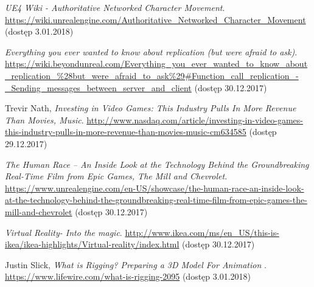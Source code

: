 \documentclass[multip]{SGGW-thesis}
\begin{document}
\begin{thebibliography}{9}
\textit{UE4 Wiki - Authoritative Networked Character Movement}. \url{https://wiki.unrealengine.com/Authoritative_Networked_Character_Movement}  (dostęp 3.01.2018)

\textit{Everything you ever wanted to know about replication (but were afraid to ask)}. \url{https://wiki.beyondunreal.com/Everything_you_ever_wanted_to_know_about_replication_\%28but_were_afraid_to_ask\%29#Function_call_replication_-_Sending_messages_between_server_and_client} (dostęp 30.12.2017)

Trevir Nath, \textit{Investing in Video Games: This Industry Pulls In More Revenue Than Movies, Music}.
\url{http://www.nasdaq.com/article/investing-in-video-games-this-industry-pulls-in-more-revenue-than-movies-music-cm634585} {\mbox(dostęp 29.12.2017)}

\textit{The Human Race – An Inside Look at the Technology Behind the Groundbreaking Real-Time Film from Epic Games, The Mill and Chevrolet}. \url{https://www.unrealengine.com/en-US/showcase/the-human-race-an-inside-look-at-the-technology-behind-the-groundbreaking-real-time-film-from-epic-games-the-mill-and-chevrolet} (dostęp 30.12.2017)

\textit{Virtual Reality- Into the magic}. \url{http://www.ikea.com/ms/en_US/this-is-ikea/ikea-highlights/Virtual-reality/index.html} (dostęp 30.12.2017)

Justin Slick, \textit{What is Rigging? Preparing a 3D Model For Animation }. \url{https://www.lifewire.com/what-is-rigging-2095}  (dostęp 3.01.2018)






\end{thebibliography}

\beforelastpage
 \thispagestyle{empty} \newpage \null \thispagestyle{empty}
\end{document}
